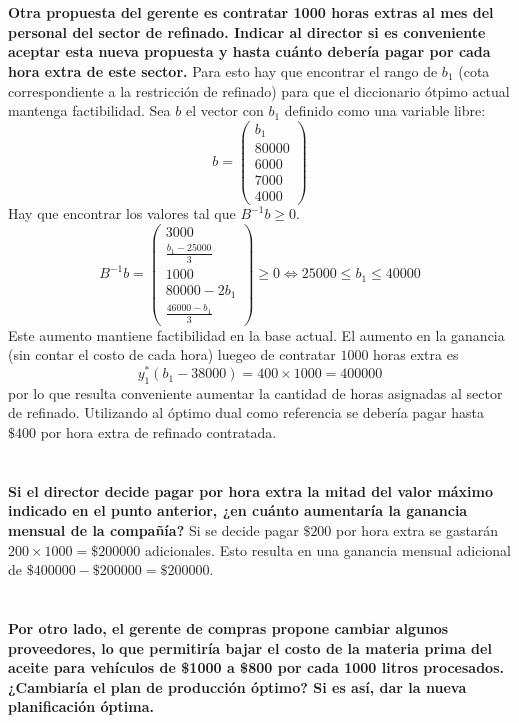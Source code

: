 \documentclass[10pt,a4paper]{article}
\begin{document}
\section{} %
\textbf{Otra propuesta del gerente es contratar 1000 horas extras al mes del personal del sector de refinado. Indicar al director si es conveniente aceptar esta nueva propuesta y hasta cuánto debería pagar por cada hora extra de este sector.}
Para esto hay que encontrar el rango de $b_1$ (cota correspondiente a la restricción de refinado) para que el diccionario ótpimo actual mantenga factibilidad. Sea $b$ el vector con $b_1$ definido como una variable libre:
$$
b = \begin{pmatrix}
	b_1 \\
	80000 \\
	6000 \\
	7000 \\
	4000
\end{pmatrix}
$$
Hay que encontrar los valores tal que $B^{-1}b \geq 0$.
$$
B^{-1}b =
\begin{pmatrix}
	3000 \\
	\frac{b_1 - 25000}{3} \\
	1000 \\
	80000 - 2b_1 \\
	\frac{46000 - b_1}{3}
\end{pmatrix} \geq 0 \iff 25000 \leq b_1 \leq 40000
$$
Este aumento mantiene factibilidad en la base actual. El aumento en la ganancia (sin contar el costo de cada hora) luegeo de contratar $1000$ horas extra es $$y^*_1(b_1 - 38000) = 400 \times 1000 = 400000$$
por lo que resulta conveniente aumentar la cantidad de horas asignadas al sector de refinado. Utilizando al óptimo dual como referencia se debería pagar hasta $\$400$ por hora extra de refinado contratada.
\section{} %
\textbf{Si el director decide pagar por hora extra la mitad del valor máximo indicado en el punto anterior, ¿en cuánto aumentaría la ganancia mensual de la compañía?}
Si se decide pagar $\$200$ por hora extra se gastarán $200 \times 1000 = \$200000$ adicionales. Esto resulta en una ganancia mensual adicional de $\$400000 - \$200000 = \$200000$.

\section{} %
\textbf{Por otro lado, el gerente de compras propone cambiar algunos proveedores, lo que permitiría bajar el costo de la materia prima del aceite para vehículos de \$1000 a \$800 por cada 1000 litros procesados. ¿Cambiaría el plan de producción óptimo? Si es así, dar la nueva planificación óptima.}
\end{document}
